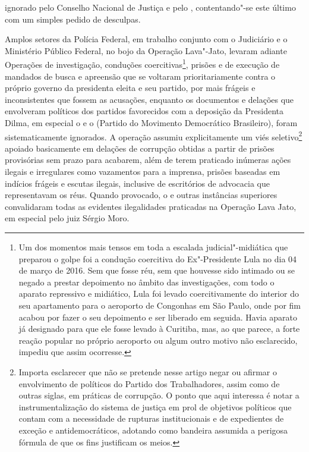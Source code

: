ignorado pelo Conselho Nacional de Justiça e pelo , contentando"-se
este último com um simples pedido de desculpas.

Amplos setores da Polícia Federal, em trabalho conjunto com o Judiciário
e o Ministério Público Federal, no bojo da Operação Lava"-Jato, levaram
adiante Operações de investigação, conduções coercitivas\footnote{Um dos
  momentos mais tensos em toda a escalada judicial"-midiática que
  preparou o golpe foi a condução coercitiva do Ex"-Presidente Lula no
  dia 04 de março de 2016. Sem que fosse réu, sem que houvesse sido
  intimado ou se negado a prestar depoimento no âmbito das
  investigações, com todo o aparato repressivo e midiático, Lula foi
  levado coercitivamente do interior do seu apartamento para o aeroporto
  de Congonhas em São Paulo, onde por fim acabou por fazer o seu
  depoimento e ser liberado em seguida. Havia aparato já designado para
  que ele fosse levado à Curitiba, mas, ao que parece, a forte reação
  popular no próprio aeroporto ou algum outro motivo não esclarecido,
  impediu que assim ocorresse.}, prisões e de execução de mandados de
busca e apreensão que se voltaram prioritariamente contra o próprio
governo da presidenta eleita e seu partido, por mais frágeis e
inconsistentes que fossem as acusações, enquanto os documentos e
delações que envolveram políticos dos partidos favorecidos com a
deposição da Presidenta Dilma, em especial o  e o  (Partido do
Movimento Democrático Brasileiro), foram sistematicamente ignorados. A
operação assumiu explicitamente um viés seletivo\footnote{Importa
  esclarecer que não se pretende nesse artigo negar ou afirmar o
  envolvimento de políticos do Partido dos Trabalhadores, assim como de
  outras siglas, em práticas de corrupção. O ponto que aqui interessa é
  notar a instrumentalização do sistema de justiça em prol de objetivos
  políticos que contam com a necessidade de rupturas institucionais e de
  expedientes de exceção e antidemocráticos, adotando como bandeira
  assumida a perigosa fórmula de que os fins justificam os meios.}
apoiado basicamente em delações de corrupção obtidas a partir de prisões
provisórias sem prazo para acabarem, além de terem praticado inúmeras
ações ilegais e irregulares como vazamentos para a imprensa, prisões
baseadas em indícios frágeis e escutas ilegais, inclusive de escritórios
de advocacia que representavam os réus.
Quando provocado, o  e outras instâncias superiores
convalidaram todas as evidentes ilegalidades praticadas na Operação
Lava Jato, em especial pelo juiz Sérgio Moro.

